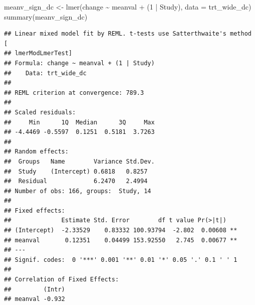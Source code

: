 \documentclass[
]{article}
\newenvironment{Shaded}{\begin{snugshade}}{\end{snugshade}}
\newcommand{\AttributeTok}[1]{\textcolor[rgb]{0.77,0.63,0.00}{#1}}
\newcommand{\DecValTok}[1]{\textcolor[rgb]{0.00,0.00,0.81}{#1}}
\newcommand{\FunctionTok}[1]{\textcolor[rgb]{0.00,0.00,0.00}{#1}}
\newcommand{\NormalTok}[1]{#1}
\newcommand{\OtherTok}[1]{\textcolor[rgb]{0.56,0.35,0.01}{#1}}
\newcommand{\SpecialCharTok}[1]{\textcolor[rgb]{0.00,0.00,0.00}{#1}}
\begin{document}
\begin{Shaded}
\begin{Highlighting}[]
\NormalTok{meanv\_sign\_dc }\OtherTok{\textless{}{-}} \FunctionTok{lmer}\NormalTok{(change }\SpecialCharTok{\textasciitilde{}}\NormalTok{ meanval }\SpecialCharTok{+}\NormalTok{ (}\DecValTok{1} \SpecialCharTok{|}\NormalTok{ Study), }\AttributeTok{data =}\NormalTok{ trt\_wide\_dc)}
\FunctionTok{summary}\NormalTok{(meanv\_sign\_dc)}
\end{Highlighting}
\end{Shaded}

\begin{verbatim}
## Linear mixed model fit by REML. t-tests use Satterthwaite's method [
## lmerModLmerTest]
## Formula: change ~ meanval + (1 | Study)
##    Data: trt_wide_dc
## 
## REML criterion at convergence: 789.3
## 
## Scaled residuals: 
##     Min      1Q  Median      3Q     Max 
## -4.4469 -0.5597  0.1251  0.5181  3.7263 
## 
## Random effects:
##  Groups   Name        Variance Std.Dev.
##  Study    (Intercept) 0.6818   0.8257  
##  Residual             6.2470   2.4994  
## Number of obs: 166, groups:  Study, 14
## 
## Fixed effects:
##              Estimate Std. Error        df t value Pr(>|t|)   
## (Intercept)  -2.33529    0.83332 100.93794  -2.802  0.00608 **
## meanval       0.12351    0.04499 153.92550   2.745  0.00677 **
## ---
## Signif. codes:  0 '***' 0.001 '**' 0.01 '*' 0.05 '.' 0.1 ' ' 1
## 
## Correlation of Fixed Effects:
##         (Intr)
## meanval -0.932
\end{verbatim}
\end{document}

